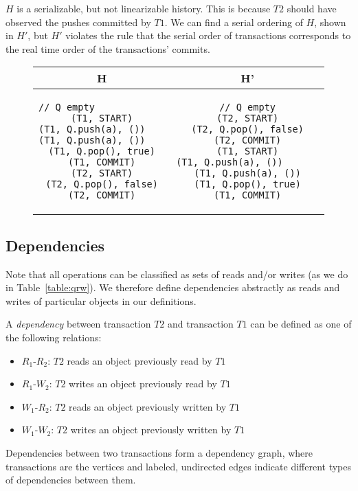 \begin{eg}
$H$ is a serializable, but not linearizable history. This is because $T2$ should have observed the pushes committed by $T1$. We can find a serial ordering of $H$, shown in $H'$, but $H'$ violates the rule that the serial order of transactions corresponds to the real time order of the transactions' commits.
    
\begin{figure}[H]
    \centering
\singlespacing   
    \begin{tabular}{c|c}
H & H'\\
\hline
\begin{lstlisting}
// Q empty                          
(T1, START)
(T1, Q.push(a), ())                
(T1, Q.push(a), ())               
(T1, Q.pop(), true)
(T1, COMMIT)
(T2, START)
(T2, Q.pop(), false)
(T2, COMMIT)
\end{lstlisting} & 
\begin{lstlisting}
// Q empty
(T2, START)
(T2, Q.pop(), false)
(T2, COMMIT)
(T1, START)
(T1, Q.push(a), ())                       
(T1, Q.push(a), ())
(T1, Q.pop(), true)
(T1, COMMIT)
\end{lstlisting}
    \end{tabular}
\end{figure}
\end{eg}

\subsection{Dependencies}

Note that all operations can be classified as sets of reads and/or writes (as we do in Table~\ref{table:qrw}). We therefore define dependencies abstractly as reads and writes of particular objects in our definitions.

\begin{defn}
    A \emph{dependency} between transaction $T2$ and transaction $T1$ can be defined as one of the following relations:
    \begin{itemize}
        \item $R_1$-$R_2$: $T2$ reads an object previously read by $T1$
        \item $R_1$-$W_2$: $T2$ writes an object previously read by $T1$
        \item $W_1$-$R_2$: $T2$ reads an object previously written by $T1$
        \item $W_1$-$W_2$: $T2$ writes an object previously written by $T1$
    \end{itemize}
    Dependencies between two transactions form a dependency graph, where transactions are the vertices and labeled, undirected edges indicate different types of dependencies between them.
\end{defn}

